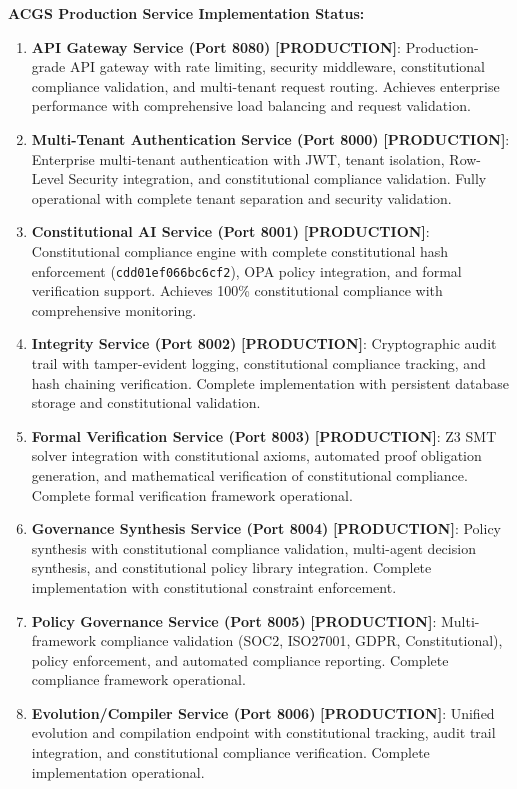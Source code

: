 \documentclass[manuscript,screen,9pt]{acmart}
\begin{document}
\textbf{ACGS Production Service Implementation Status:}
\begin{enumerate}[leftmargin=*,itemsep=1pt,parsep=1pt]
    \item \textbf{API Gateway Service (Port 8080)} \textbf{[PRODUCTION]}: Production-grade API gateway with rate limiting, security middleware, constitutional compliance validation, and multi-tenant request routing. Achieves enterprise performance with comprehensive load balancing and request validation.
    \item \textbf{Multi-Tenant Authentication Service (Port 8000)} \textbf{[PRODUCTION]}: Enterprise multi-tenant authentication with JWT, tenant isolation, Row-Level Security integration, and constitutional compliance validation. Fully operational with complete tenant separation and security validation.
    \item \textbf{Constitutional AI Service (Port 8001)} \textbf{[PRODUCTION]}: Constitutional compliance engine with complete constitutional hash enforcement (\texttt{cdd01ef066bc6cf2}), OPA policy integration, and formal verification support. Achieves 100\% constitutional compliance with comprehensive monitoring.
    \item \textbf{Integrity Service (Port 8002)} \textbf{[PRODUCTION]}: Cryptographic audit trail with tamper-evident logging, constitutional compliance tracking, and hash chaining verification. Complete implementation with persistent database storage and constitutional validation.
    \item \textbf{Formal Verification Service (Port 8003)} \textbf{[PRODUCTION]}: Z3 SMT solver integration with constitutional axioms, automated proof obligation generation, and mathematical verification of constitutional compliance. Complete formal verification framework operational.
    \item \textbf{Governance Synthesis Service (Port 8004)} \textbf{[PRODUCTION]}: Policy synthesis with constitutional compliance validation, multi-agent decision synthesis, and constitutional policy library integration. Complete implementation with constitutional constraint enforcement.
    \item \textbf{Policy Governance Service (Port 8005)} \textbf{[PRODUCTION]}: Multi-framework compliance validation (SOC2, ISO27001, GDPR, Constitutional), policy enforcement, and automated compliance reporting. Complete compliance framework operational.
    \item \textbf{Evolution/Compiler Service (Port 8006)} \textbf{[PRODUCTION]}: Unified evolution and compilation endpoint with constitutional tracking, audit trail integration, and constitutional compliance verification. Complete implementation operational.
\end{enumerate}
\end{document}
